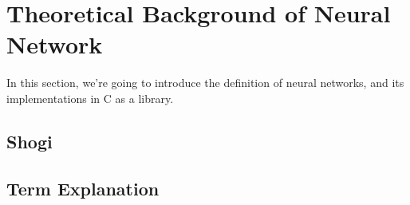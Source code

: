 \section{Theoretical Background of Neural Network}
    In this section, we're going to introduce the definition of neural networks, and its implementations in C as a library.
	\subsection{Shogi}
	\subsection{Term Explanation}
	\subsection{}
    

	